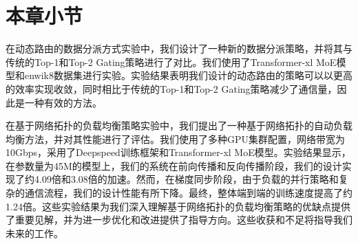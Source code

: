 \section{本章小节}

在动态路由的数据分派方式实验中，我们设计了一种新的数据分派策略，并将其与传统的Top-1和Top-2 Gating策略进行了对比。我们使用了Transformer-xl MoE模型和enwik8数据集进行实验。实验结果表明我们设计的动态路由的策略可以以更高的效率实现收敛，同时相比于传统的Top-1和Top-2 Gating策略减少了通信量，因此是一种有效的方法。


在基于网络拓扑的负载均衡策略实验中，我们提出了一种基于网络拓扑的自动负载均衡方法，并对其性能进行了评估。我们使用了多种GPU集群配置，网络带宽为10Gbps，采用了Deepspeed训练框架和Transformer-xl MoE模型。实验结果显示，在参数量为45M的模型上，我们的系统在前向传播和反向传播阶段，我们的设计实现了约4.09倍和3.08倍的加速。然而，在梯度同步阶段，由于负载的并行策略和复杂的通信流程，我们的设计性能有所下降。最终，整体端到端的训练速度提高了约1.24倍。这些实验结果为我们深入理解基于网络拓扑的负载均衡策略的优缺点提供了重要见解，并为进一步优化和改进提供了指导方向。这些收获和不足将指导我们未来的工作。

\endinput